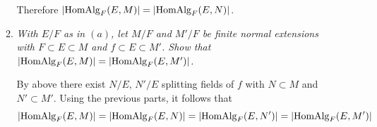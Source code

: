 \documentclass[10pt]{article}
\begin{document}
\begin{enumerate}
\begin{enumerate}
Therefore $\left| \operatorname{HomAlg}_F(E,M) \right| = \left| \operatorname{HomAlg}_F(E,N) \right|$.

\item \emph{With $E/F$ as in $(a)$, let $M/F$ and $M'/F$ be finite normal extensions with $F \subset E \subset M$ and $f \subset E \subset M'$.  Show that $\left| \operatorname{HomAlg}_F(E,M) \right| = \left| \operatorname{HomAlg}_F(E,M') \right|$.}

By above there exist $N/E$, $N'/E$ splitting fields of $f$ with $N \subset M$ and $N' \subset M'$.  Using the previous parts, it follows that
\[
\left| \operatorname{HomAlg}_F(E,M) \right| = \left| \operatorname{HomAlg}_F(E,N) \right| = \left| \operatorname{HomAlg}_F(E,N') \right| = \left| \operatorname{HomAlg}_F(E,M') \right|
\]
\end{enumerate}
\end{enumerate}
\end{document}
